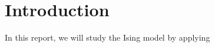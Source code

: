 \documentclass[../main.tex]{subfiles}
\begin{document}
\section{Introduction}
In this report, we will study the Ising model by applying 
\end{document}
